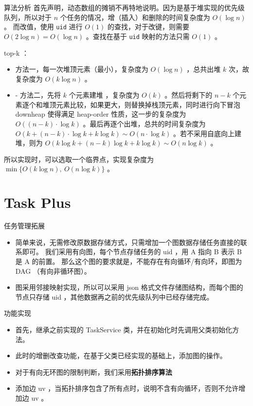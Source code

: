 \documentclass{beamer}
\begin{document}
\begin{frame}{算法分析}
首先声明，动态数组的摊销不再特地说明。因为是基于堆实现的优先级队列，所以对于 $n$ 个任务的情况，增（插入）和删除的时间复杂度为 $O(\log n)$ 。
而改值，使用 \texttt{uid} 进行 $O(1)$ 的查找，对于改键，则需要 $O(2\log n) = O(\log n)$ 。查找在基于 \texttt{uid} 映射的方法只需 $O(1)$ 。

top-k ：
\begin{itemize}
\item 方法一，每一次堆顶元素（最小），复杂度为 $O(\log n)$ ，总共出堆 $k$ 次，故复杂度为 $O(k\log n)$ 。
\item - 方法二，先将 $k$ 个元素建堆 ，复杂度为 $O(k)$ 。然后将剩下的 $n-k$ 个元素逐个和堆顶元素比较，如果更大，则替换掉栈顶元素，同时进行向下冒泡 downheap 使得满足 heap-order 性质，这一步的复杂度为 $O((n-k)\cdot \log k)$ 。最后再逐个出堆，总共的时间复杂度为 $O(k + (n-k)\cdot \log k + k\log k) \sim O(n\cdot \log k)$ 。若不采用自底向上建堆，则为 $O(k\log k + (n-k)\log k + k \log k) \sim O(n\log k)$ 。
\end{itemize}

所以实现时，可以选取一个临界点，实现复杂度为 $\min \{ O(k\log n),\ O(n\log k) \}$ 。
\end{frame}


\section{Task Plus}

\begin{frame}{任务管理拓展}
\begin{itemize}
\item 简单来说，无需修改原数据存储方式，只需增加一个图数据存储任务直接的联系即可。
我们采用有向图，每个节点存储任务的 uid ，用 A 指向 B 表示 B 是 A 的前置。
那么这个图的要求就是，不能存在有向循环/有向环，即图为 DAG （有向非循环图）。
\item 图采用邻接映射实现，所以可以采用 json 格式文件存储图结构，而每个图的节点只存储 uid ，其他数据再之前的优先级队列中已经存储完成。
\end{itemize}
\end{frame}

\begin{frame}{功能实现}
\begin{itemize}
\item 首先，继承之前实现的 TaskService 类，并在初始化时先调用父类初始化方法。
\item 此时的增删改查功能，在基于父类已经实现的基础上，添加图的操作。
\item 对于有向无环图的限制判断，我们采用\textbf{拓扑排序算法}
\item 添加边 uv ，当拓扑排序包含了所有点时，说明不含有向循环，否则不允许增加边 uv 。
\end{itemize}
\end{frame}
\end{document}
